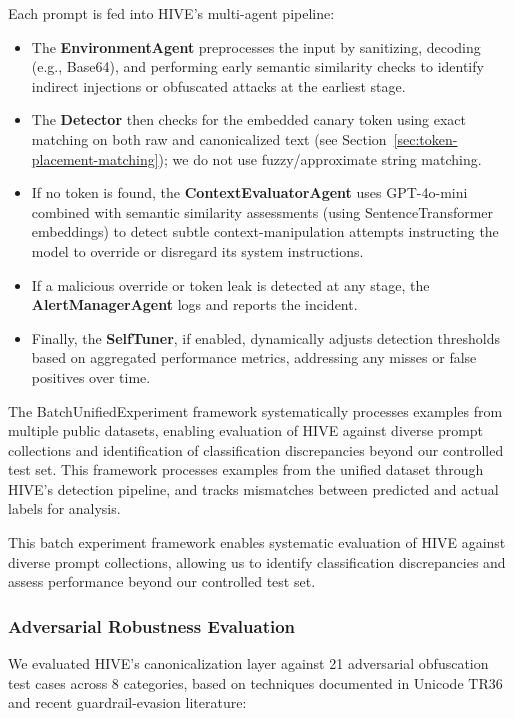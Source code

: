 \documentclass[manuscript,screen,review]{acmart}
\begin{document}
\noindent
Each prompt is fed into HIVE's multi-agent pipeline:
\begin{itemize} 
\item The \textbf{EnvironmentAgent} preprocesses the input by sanitizing, decoding (e.g., Base64), and performing early semantic similarity checks to identify indirect injections or obfuscated attacks at the earliest stage.
\item The \textbf{Detector} then checks for the embedded canary token using exact matching on both raw and canonicalized text (see Section~\ref{sec:token-placement-matching}); we do not use fuzzy/approximate string matching.
\item If no token is found, the \textbf{ContextEvaluatorAgent} uses GPT-4o-mini combined with semantic similarity assessments (using SentenceTransformer embeddings) to detect subtle context-manipulation attempts instructing the model to override or disregard its system instructions. 
\item If a malicious override or token leak is detected at any stage, the \textbf{AlertManagerAgent} logs and reports the incident. 
\item Finally, the \textbf{SelfTuner}, if enabled, dynamically adjusts detection thresholds based on aggregated performance metrics, addressing any misses or false positives over time. 
\end{itemize}

The BatchUnifiedExperiment framework systematically processes examples from multiple public datasets, enabling evaluation of HIVE against diverse prompt collections and identification of classification discrepancies beyond our controlled test set. This framework processes examples from the unified dataset through HIVE's detection pipeline, and tracks mismatches between predicted and actual labels for analysis.

This batch experiment framework enables systematic evaluation of HIVE against diverse prompt collections, allowing us to identify classification discrepancies and assess performance beyond our controlled test set.

\subsubsection{Adversarial Robustness Evaluation}

We evaluated HIVE's canonicalization layer against 21 adversarial obfuscation test cases across 8 categories, based on techniques documented in Unicode TR36 and recent guardrail-evasion literature:
\end{document}
